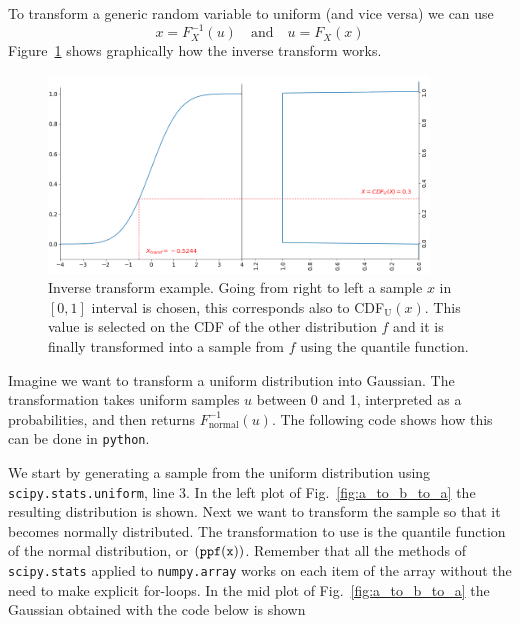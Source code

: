 To transform a generic random variable to uniform (and vice versa) we can use
\begin{equation}
x = F_{X}^{-1}(u)\quad\mathrm{and}\quad u = F_X(x)	
\end{equation} 
\noindent Figure~\ref{fig:inverse_transform} shows graphically how the inverse transform works.

\begin{figure}[htb]
\centering
\includegraphics[width=0.9\textwidth]{figures/inverse_transform}
\caption{Inverse transform example. Going from right to left a sample $x$ in $[0,1]$ interval is chosen, this corresponds also to CDF$_{\text{U}}(x)$. This value is selected on the CDF of the other distribution $f$ and it is finally transformed into a sample from $f$ using the quantile function.}
\label{fig:inverse_transform}
\end{figure}

Imagine we want to transform a uniform distribution into Gaussian. The transformation takes uniform samples $u$ between 0 and 1, interpreted as a probabilities, and then returns $F_{\text{normal}}^{-1}(u)$. The following code shows how this can be done in \texttt{python}. 


We start by generating a sample from the uniform distribution using \texttt{scipy.stats.uniform}, line 3. 
In the left plot of Fig.~\ref{fig:a_to_b_to_a} the resulting distribution is shown.
Next we want to transform the sample so that it becomes normally distributed. The transformation to use is the quantile function of the normal distribution, or $(\tt{ppf(x))}$. Remember that all the methods of \texttt{scipy.stats} applied to \texttt{numpy.array} works on each item of the array without the need to make explicit for-loops.
In the mid plot of Fig.~\ref{fig:a_to_b_to_a} the Gaussian obtained with the code below is shown

